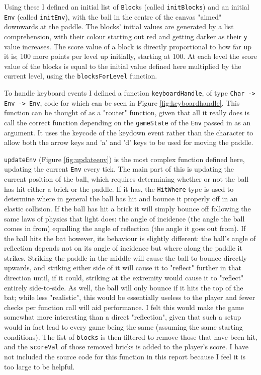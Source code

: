 \documentclass[12pt]{article}
\begin{document}
\par

Using these I defined an initial list of \verb|Block|s (called \verb|initBlocks|) and an initial \verb|Env| (called \verb|initEnv|), with the ball in the centre of the canvas "aimed" downwards at the paddle.
The blocks' initial values are generated by a list comprehension, with their colour starting out red and getting darker as their \verb|y| value increases.
The score value of a block is directly proportional to how far up it is; 100 more points per level up initially, starting at 100.
At each level the score value of the blocks is equal to the initial value defined here multiplied by the current level, using the \verb|blocksForLevel| function.

\par

To handle keyboard events I defined a function \verb|keyboardHandle|, of type \verb|Char -> Env -> Env|, code for which can be seen in Figure \ref{fig:keyboardhandle}.
This function can be thought of as a "router" function, given that all it really does is call the correct function depending on the \verb|gameState| of the \verb|Env| passed in as an argument.
It uses the keycode of the keydown event rather than the character to allow both the arrow keys and 'a' and 'd' keys to be used for moving the paddle.


\par

\verb|updateEnv| (Figure \ref{fig:updateenv}) is the most complex function defined here, updating the current \verb|Env| every tick.
The main part of this is updating the current position of the ball, which requires determining whether or not the ball has hit either a brick or the paddle.
If it has, the \verb|HitWhere| type is used to determine where in general the ball has hit and bounce it properly off in an elastic collision.
If the ball has hit a brick it will simply bounce off following the same laws of physics that light does: the angle of incidence (the angle the ball comes in from) equalling the angle of reflection (the angle it goes out from).
If the ball hits the bat however, its behaviour is slightly different: the ball's angle of reflection depends not on its angle of incidence but where along the paddle it strikes.
Striking the paddle in the middle will cause the ball to bounce directly upwards, and striking either side of it will cause it to "reflect" further in that direction until, if it could, striking at the extremity would cause it to "reflect" entirely side-to-side.
As well, the ball will only bounce if it hits the top of the bat; while less "realistic", this would be essentially useless to the player and fewer checks per function call will aid performance.
I felt this would make the game somewhat more interesting than a direct "reflection", given that such a setup would in fact lead to every game being the same (assuming the same starting conditions).
The list of \verb|blocks| is then filtered to remove those that have been hit, and the \verb|scoreVal| of those removed bricks is added to the player's score.
I have not included the source code for this function in this report because I feel it is too large to be helpful.
\end{document}
